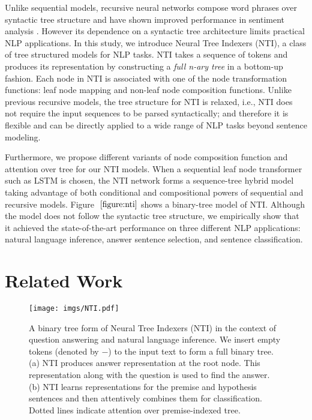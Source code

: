 \documentclass[11pt]{article}
\begin{document}
Unlike sequential models, recursive neural networks compose word phrases over syntactic tree structure and have shown improved performance in sentiment analysis \cite{socher2013recursive}. However its dependence on a syntactic tree architecture limits practical NLP applications.  In this study, we introduce Neural Tree Indexers (NTI), a class of tree structured models for NLP tasks. NTI takes a sequence of tokens and produces its representation by constructing a \textit{full n-ary tree} in a bottom-up fashion. Each node in NTI is associated with one of the node transformation functions: leaf node mapping and non-leaf node composition functions. Unlike previous recursive models, the tree structure for NTI is relaxed, i.e., NTI does not require the input sequences to be parsed syntactically; and therefore it is flexible and can be directly applied to a wide range of NLP tasks beyond sentence modeling. 

Furthermore, we propose different variants of node composition function and attention over tree for our NTI models. When a sequential leaf node transformer such as LSTM is chosen, the NTI network forms a sequence-tree hybrid model taking advantage of both conditional and compositional powers of sequential and recursive models. Figure $~\ref{figure:nti}$ shows a binary-tree model of NTI. Although the model does not follow the syntactic tree structure, we empirically show that it achieved the state-of-the-art performance on three different NLP applications: natural language inference, answer sentence selection, and sentence classification. 

\section{Related Work}

\begin{figure*}[t]
\centering
        \texttt{[image: imgs/NTI.pdf]}
        \caption{\label{figure:nti} A binary tree form of Neural Tree Indexers (NTI) in the context of question answering and natural language inference. We insert empty tokens (denoted by $-$) to the input text to form a full binary tree. (a) NTI produces answer representation at the root node. This representation along with the question is used to find the answer. (b) NTI learns representations for the premise and hypothesis sentences and then attentively combines them for classification. Dotted lines indicate attention over premise-indexed tree.}
        \label{figure:nti}
\end{figure*}
\end{document}
